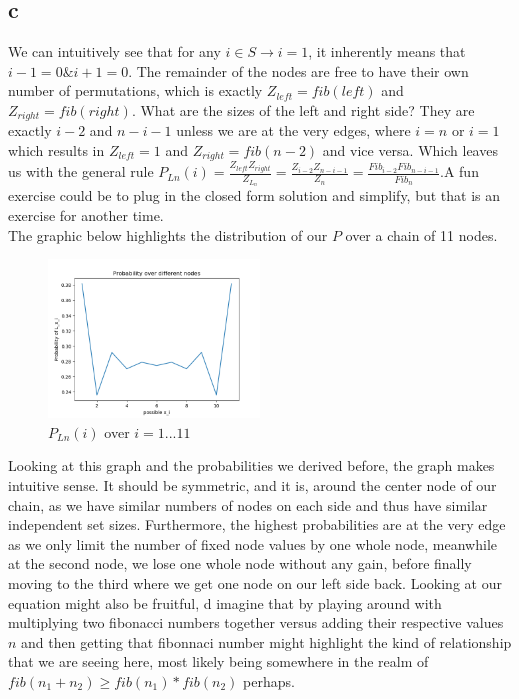 \documentclass[12pt]{article}
\begin{document}
\subsection{c}

We can intuitively see that for any $i \in S \rightarrow i=1$, it inherently means that \\
$i-1 = 0 \& i+1 = 0$. The remainder of the nodes are free to have their own number of permutations, which is exactly $Z_{left} = fib(left)$ and $Z_{right} = fib(right)$. What are the sizes of the left and right side? They are exactly $i-2$ and $n-i-1$ unless we are at the very edges, where $i=n$ or $i=1$ which results in $Z_{left}=1$ and $Z_{right} = fib(n-2)$ and vice versa. Which leaves us with the general rule 
$P_{Ln}(i)=\frac{Z_{left}Z_{right}}{Z_{L_n}} = \frac{Z_{i-2}Z_{n-i-1}}{Z_{n}} = \frac{Fib_{i-2}Fib_{n-i-1}}{Fib_{n}}$.A fun exercise could be to plug in the closed form solution and simplify, but that is an exercise for another time.\\
 The graphic below highlights the distribution of our $P$ over a chain of 11 nodes.
\begin{figure}[H]
	\includegraphics[width=0.5\textwidth]{p2_3.png}
	\caption{$P_{Ln}(i)$ over $i = 1...11$}
\end{figure}

Looking at this graph and the probabilities we derived before, the graph makes intuitive sense. It should be symmetric, and it is, around the center node of our chain, as we have similar numbers of nodes on each side and thus have similar independent set sizes. Furthermore, the highest probabilities are at the very edge as we only limit the number of fixed node values by one whole node, meanwhile at the second node, we lose one whole node without any gain, before finally moving to the third where we get one node on our left side back. Looking at our equation might also be fruitful, d imagine that by playing around with multiplying two fibonacci numbers together versus adding their respective values $n$ and then getting that fibonnaci number might highlight the kind of relationship that we are seeing here, most likely being somewhere in the realm of $fib(n_1+n_2) \ge fib(n_1)*fib(n_2)$ perhaps.
\end{document}
